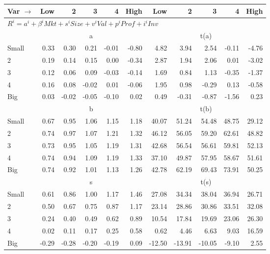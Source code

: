 
\begin{tabular}{lrrrrrrrrrr}
  \toprule
    
    Var $\rightarrow$ & Low & 2 & 3 & 4 & High & Low & 2 & 3 & 4 & High  \\ 
  \midrule
  \multicolumn{11}{l}{$R^i=a^i+\beta^iMkt+s^iSize+v^iVal+p^iProf+i^iInv$}  \\
  
     & \multicolumn{5}{c}{a} & \multicolumn{5}{c}{t(a)}   \\
     \cmidrule(r){2-6} \cmidrule(r){7-11} 
    Small  & 0.33  & 0.30  & 0.21  & -0.01  & -0.80  & 4.82  & 3.94  & 2.54  & -0.11  & -4.76   \\
    2  & 0.19  & 0.14  & 0.15  & 0.00  & -0.34  & 2.87  & 1.94  & 2.06  & 0.01  & -3.02   \\
    3  & 0.12  & 0.06  & 0.09  & -0.03  & -0.14  & 1.69  & 0.84  & 1.13  & -0.35  & -1.37   \\
    4  & 0.16  & 0.08  & -0.02  & 0.01  & -0.06  & 1.95  & 0.98  & -0.29  & 0.13  & -0.58   \\
    Big  & 0.03  & -0.02  & -0.05  & -0.10  & 0.02  & 0.49  & -0.31  & -0.87  & -1.56  & 0.23   \\
    
  
     & \multicolumn{5}{c}{b} & \multicolumn{5}{c}{t(b)}   \\
     \cmidrule(r){2-6} \cmidrule(r){7-11} 
    Small  & 0.67  & 0.95  & 1.06  & 1.15  & 1.18  & 40.07  & 51.24  & 54.48  & 48.75  & 29.12   \\
    2  & 0.74  & 0.97  & 1.07  & 1.21  & 1.32  & 46.12  & 56.05  & 59.20  & 62.61  & 48.82   \\
    3  & 0.73  & 0.95  & 1.05  & 1.19  & 1.31  & 42.68  & 56.54  & 56.61  & 59.81  & 52.13   \\
    4  & 0.74  & 0.94  & 1.09  & 1.19  & 1.33  & 37.10  & 49.87  & 57.95  & 58.67  & 51.61   \\
    Big  & 0.74  & 0.92  & 1.01  & 1.13  & 1.26  & 42.78  & 62.19  & 69.43  & 73.91  & 50.25   \\
    
  
     & \multicolumn{5}{c}{s} & \multicolumn{5}{c}{t(s)}   \\
     \cmidrule(r){2-6} \cmidrule(r){7-11} 
    Small  & 0.61  & 0.86  & 1.00  & 1.17  & 1.46  & 27.08  & 34.34  & 38.04  & 36.94  & 26.71   \\
    2  & 0.50  & 0.67  & 0.75  & 0.87  & 1.17  & 23.14  & 28.86  & 30.86  & 33.51  & 32.08   \\
    3  & 0.24  & 0.40  & 0.49  & 0.62  & 0.89  & 10.54  & 17.84  & 19.69  & 23.06  & 26.30   \\
    4  & 0.02  & 0.11  & 0.17  & 0.25  & 0.58  & 0.62  & 4.46  & 6.63  & 9.03  & 16.59   \\
    Big  & -0.29  & -0.28  & -0.20  & -0.19  & 0.09  & -12.50  & -13.91  & -10.05  & -9.10  & 2.55   \\
    

\end{tabular}
